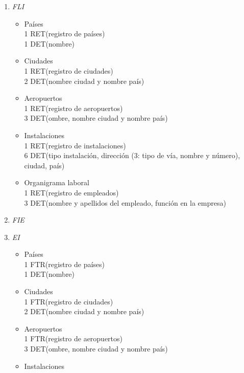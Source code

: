 
			\begin{enumerate}
			\item \textit{FLI}
				\begin{itemize}
					\item Países \\
					1 RET(registro de países) \\
					1 DET(nombre) \\
					\item Ciudades \\
					1 RET(registro de ciudades) \\
					2 DET(nombre ciudad y nombre país) \\
					\item Aeropuertos \\
					1 RET(registro de aeropuertos) \\
					3 DET(ombre, nombre ciudad y nombre país) \\
					\item Instalaciones \\
					1 RET(registro de instalaciones) \\
					6 DET(tipo instalación, dirección (3: tipo de vía, nombre y número), ciudad, país) \\
					\item Organigrama laboral \\
					1 RET(registro de empleados) \\
					3 DET(nombre y apellidos del empleado, función en la empresa) \\
				\end{itemize}
			\item \textit{FIE}
			\item \textit{EI}
				\begin{itemize}
					\item Países \\
					1 FTR(registro de países) \\
					1 DET(nombre) \\
					\item Ciudades \\
					1 FTR(registro de ciudades) \\
					2 DET(nombre ciudad y nombre país) \\
					\item Aeropuertos \\
					1 FTR(registro de aeropuertos) \\
					3 DET(ombre, nombre ciudad y nombre país) \\
					\item Instalaciones \\

\end{itemize}
\end{enumerate}
